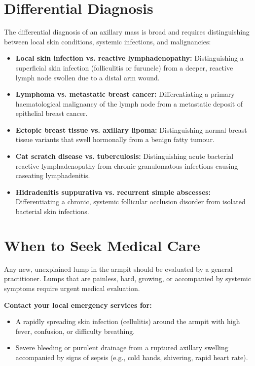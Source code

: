 \section*{Differential Diagnosis}
The differential diagnosis of an axillary mass is broad and requires distinguishing between local skin conditions, systemic infections, and malignancies:
\begin{itemize}
    \item \textbf{Local skin infection vs. reactive lymphadenopathy:} Distinguishing a superficial skin infection (folliculitis or furuncle) from a deeper, reactive lymph node swollen due to a distal arm wound.
    \item \textbf{Lymphoma vs. metastatic breast cancer:} Differentiating a primary haematological malignancy of the lymph node from a metastatic deposit of epithelial breast cancer.
    \item \textbf{Ectopic breast tissue vs. axillary lipoma:} Distinguishing normal breast tissue variants that swell hormonally from a benign fatty tumour.
    \item \textbf{Cat scratch disease vs. tuberculosis:} Distinguishing acute bacterial reactive lymphadenopathy from chronic granulomatous infections causing caseating lymphadenitis.
    \item \textbf{Hidradenitis suppurativa vs. recurrent simple abscesses:} Differentiating a chronic, systemic follicular occlusion disorder from isolated bacterial skin infections.
\end{itemize}

\section*{When to Seek Medical Care}
Any new, unexplained lump in the armpit should be evaluated by a general practitioner. Lumps that are painless, hard, growing, or accompanied by systemic symptoms require urgent medical evaluation.

\textbf{Contact your local emergency services for:}
\begin{itemize}
    \item A rapidly spreading skin infection (cellulitis) around the armpit with high fever, confusion, or difficulty breathing.
    \item Severe bleeding or purulent drainage from a ruptured axillary swelling accompanied by signs of sepsis (e.g., cold hands, shivering, rapid heart rate).
\end{itemize}

